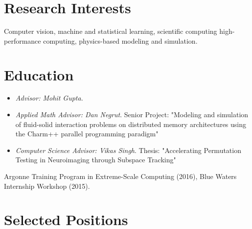 \documentclass[11pt,a4paper,sans]{moderncv}        %
\begin{document}
\makecvtitle

\section{Research Interests}
Computer vision, machine and statistical learning, scientific computing high-performance computing, physics-based modeling and simulation.

\section{Education}
{\begin{itemize}
\item \textit{Advisor: Mohit Gupta.}
\end{itemize}}

{\begin{itemize}
\item \textit{Applied Math Advisor: Dan Negrut}. Senior Project: "Modeling and simulation of fluid-solid interaction problems on distributed memory architectures using the Charm++ parallel programming paradigm"
\item \textit{Computer Science Advisor: Vikas Singh}. Thesis: "Accelerating Permutation Testing in Neuroimaging through Subspace Tracking"
\end{itemize}}  %
{Argonne Training Program in Extreme-Scale Computing (2016), Blue Waters Internship Workshop (2015).}


\section{Selected Positions}
\end{document}
